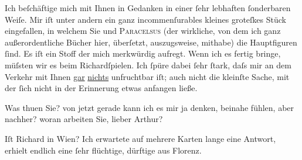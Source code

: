 \pstart
           Ich beſchäftige mich mit Ihnen in Gedanken in einer{ }ſehr lebhaften{ }ſonderbaren Weiſe.
               Mir iſt unter andern ein ganz incommenſurables kleines groteſkes Stück eingefallen, in welchem Sie und \textsc{Paracelsus} (der wirkliche, von dem ich ganz {\pb}außerordentliche Bücher hier,
               überſetzt, auszugsweise, mithabe) die Hauptfiguren{ }ſind. Es iſt ein Stoff der mich
               merkwürdig aufregt. Wenn ich es fertig bringe, müſsten wir es beim Richardſpielen. Ich{ }ſpüre dabei{ }ſehr{ }ſtark, daſs mir an
               dem Verkehr mit Ihnen \uline{gar}{ }\uline{nichts} unfruchtbar iſt; auch nicht die kleinſte
               Sache, mit der{ }ſich nicht in der {\pb}Erinnerung etwas anfangen ließe.\pend
           
\pstart
           Was thuen Sie? von \label{K_L01021-2v}\label{K_L01021-2} jetzt gerade
               kann ich es mir ja denken, beinahe fühlen, aber nachher? woran arbeiten Sie, lieber
               Arthur?\pend
           
\pstart
           Iſt Richard in Wien? Ich erwartete auf mehrere Karten lange eine Antwort, erhielt endlich
               eine{ }ſehr {\pb}flüchtige, dürftige aus
                  Florenz.\pend
           
